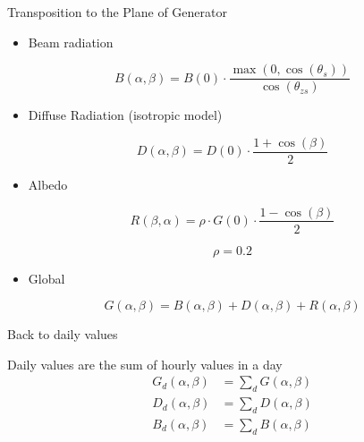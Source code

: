 \documentclass[xcolor={usenames,svgnames,dvipsnames}]{beamer}
\begin{document}
\begin{frame}[label={sec:org6d8882e}]{Transposition to the Plane of Generator}
\begin{itemize}
\item Beam radiation
\end{itemize}

\[B(\alpha,\beta)=B(0)\cdot\frac{\max(0,\cos(\theta_{s}))}{\cos(\theta_{zs})}\]

\begin{itemize}
\item Diffuse Radiation (isotropic model)
\end{itemize}

\[D(\alpha,\beta)=D(0)\cdot\frac{1+\cos(\beta)}{2}\]

\begin{itemize}
\item Albedo
\end{itemize}

\[R(\beta,\alpha)=\rho\cdot G(0)\cdot\frac{1-\cos(\beta)}{2}\]

\[\rho=0.2\]

\begin{itemize}
\item Global
\end{itemize}
\[G(\alpha, \beta) = B(\alpha, \beta) + D(\alpha, \beta) + R(\alpha, \beta)\]
\end{frame}
\begin{frame}[label={sec:orge72a51c}]{Back to daily values}
\begin{block}{Daily values are the sum of hourly values in a day}
\begin{align*}
  G_d(\alpha, \beta) &= \sum_d G(\alpha, \beta)\\
  D_d(\alpha, \beta) &= \sum_d D(\alpha, \beta)\\
  B_d(\alpha, \beta) &= \sum_d B(\alpha, \beta)\\
\end{align*}
\end{block}
\end{frame}
\end{document}
